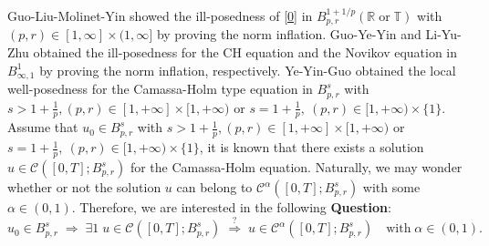 \documentclass[12pt]{article}
\begin{document}
Guo-Liu-Molinet-Yin \cite{Guo-Yin} showed the ill-posedness of \eqref{0} in $B_{p,r}^{1+1/p}(\mathbb{R}\;\text{or}\; \mathbb{T})$ with $(p,r)\in[1,\infty]\times(1,\infty]$ by proving the norm inflation. Guo-Ye-Yin \cite{Guo} and Li-Yu-Zhu \cite{24jmfm,26ampa} obtained the ill-posedness for the CH equation and the Novikov equation in $B^{1}_{\infty,1}$ by proving the norm inflation, respectively. Ye-Yin-Guo \cite{Ye} obtained the local well-posedness for the Camassa-Holm type equation in $B^s_{p,r}$ with $s>1+\frac1p,  (p,r)\in[1,+\infty]\times[1,+\infty)$ or $s=1+\frac1p, \ (p,r)\in[1,+\infty)\times \{1\}$.
Assume that $u_0\in B^s_{p,r}$ with $s>1+\frac1p,  (p,r)\in[1,+\infty]\times[1,+\infty)$ or $s=1+\frac1p, \ (p,r)\in[1,+\infty)\times \{1\}$, it is known that there exists a solution $u\in \mathcal{C}([0,T];B^s_{p,r})$ for the Camassa-Holm equation. Naturally, we may wonder whether or not the solution $u$ can belong to $\mathcal{C}^\alpha([0,T];B^s_{p,r})$ with some $\alpha\in(0,1)$. Therefore, we are interested in the following
{\bf Question}:
$$u_0\in B^s_{p,r}\;\Rightarrow\; \exists 1\;u\in \mathcal{C}([0,T];B^s_{p,r})\;\overset{?}{\Rightarrow}\; u\in\mathcal{C}^\alpha([0,T];B^s_{p,r}) \quad\text{with}\; \alpha\in(0,1).$$
\end{document}
